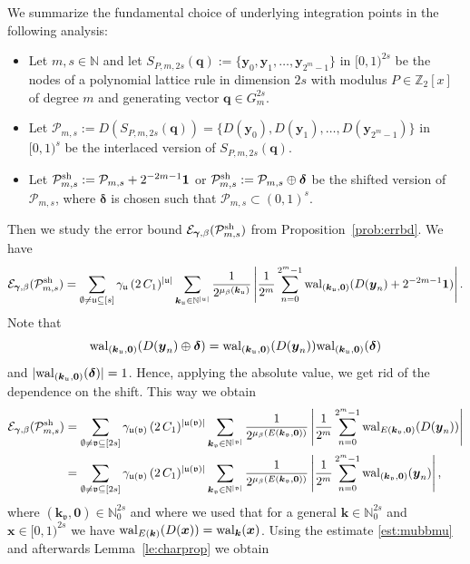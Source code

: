 \documentclass[namedate,webpdf,imanum]{ima-authoring-arxiv}%
\theoremstyle{thmstyletwo}%
\numberwithin{equation}{section}
\newcommand{\wal}{{\rm wal}}
\newcommand{\bsx}{\boldsymbol{x}}
\newcommand{\bsy}{\boldsymbol{y}}
\newcommand{\bsk}{\boldsymbol{k}}
\newcommand{\bsq}{\boldsymbol{q}}
\newcommand{\bsgamma}{\boldsymbol{\gamma}}
\newcommand{\bszero}{\boldsymbol{0}}
\newcommand{\bsdelta}{\boldsymbol{\delta}}
\newcommand{\uu}{\mathfrak{u}}
\newcommand{\vv}{\mathfrak{v}}
\newcommand{\cP}{\mathcal{P}}
\begin{document}
We summarize the fundamental choice of underlying integration points in the following analysis:
\begin{itemize}
\item Let $m,s\in \mathbb{N}$ and let $S_{P, m, 2s}(\bsq) := \{\bsy_0, \bsy_1, \ldots, \bsy_{2^m-1}\}$ in $[0,1)^{2s}$ be the nodes of a polynomial lattice rule in dimension $2 s$ with modulus $P \in \mathbb{Z}_2[x]$ of degree $m$ and generating vector $\bsq \in G_m^{2s}$. 
\item Let $\cP_{m,s} := D(S_{P,m,2s}(\bsq)) = \{D(\bsy_0), D(\bsy_1), \ldots, D(\bsy_{2^m-1})\}$ in $[0,1)^s$ be the interlaced version of $S_{P, m, 2s}(\bsq)$. 
\item Let $\cP_{m,s}^{{\rm sh}}:=\cP_{m,s} + 2^{-2m-1} \boldsymbol{1}$ or $\cP_{m,s}^{{\rm sh}} := \cP_{m,s} \oplus \bsdelta$ be the shifted version of $\cP_{m,s}$, where $\bsdelta$ is chosen such that $ \cP_{m,s} \subset (0,1)^s$.
\end{itemize}
Then we study the error bound $\mathcal{E}_{\bsgamma,\beta}(\cP_{m,s}^{{\rm sh}})$ from Proposition~\ref{prob:errbd}. We have
\begin{align*}
\mathcal{E}_{\bsgamma,\beta}(\cP_{m,s}^{{\rm sh}})=  \sum_{\emptyset \not= \uu \subseteq [s]} \gamma_{\uu} \, (2 \, C_1)^{|\uu|} \sum_{\bsk_\uu \in \mathbb{N}^{|\uu|}} \frac{1}{2^{\mu_{\beta}(\bsk_{\uu})}}  \left|\frac{1}{2^m} \sum_{n=0}^{2^m-1} \wal_{(\bsk_\uu,\bszero)}(D(\bsy_n) +2^{-2m-1} \boldsymbol{1})\right|.
\end{align*}
Note that $$\wal_{(\bsk_\uu,\bszero)}(D(\bsy_n) \oplus \bsdelta)=\wal_{(\bsk_\uu,\bszero)}(D(\bsy_n)) \wal_{(\bsk_\uu,\bszero)}(\bsdelta)$$ and $|\wal_{(\bsk_\uu,\bszero)}(\bsdelta)|=1$. Hence, applying the absolute value, we get rid of the dependence on the shift. This way we obtain 
\begin{align*}
\mathcal{E}_{\bsgamma,\beta}(\cP_{m,s}^{{\rm sh}}) & = \sum_{\emptyset \not= \vv \subseteq [2s]} \gamma_{\uu(\vv)} \, (2 \,C_1)^{|\uu(\vv)|} \sum_{\bsk_\vv \in \mathbb{N}^{|\vv|}} \frac{1}{2^{\mu_{\beta}(E(\bsk_{\vv}, \bszero))}}  \left|\frac{1}{2^m} \sum_{n=0}^{2^m-1} \wal_{E(\bsk_\vv,\bszero)}(D(\bsy_n))\right|\\
& = \sum_{\emptyset \not= \vv \subseteq [2s]} \gamma_{\uu(\vv)} \, (2 \, C_1)^{|\uu(\vv)|} \sum_{\bsk_\vv \in \mathbb{N}^{|\vv|}} \frac{1}{2^{\mu_{\beta}(E(\bsk_{\vv}, \bszero))}}  \left|\frac{1}{2^m} \sum_{n=0}^{2^m-1} \wal_{(\bsk_\vv,\bszero)}(\bsy_n)\right|,
\end{align*}
where $(\bsk_\vv, \bszero) \in \mathbb{N}_0^{2s}$ and where we used that for a general $\bsk \in \mathbb{N}_0^{2s}$ and $\bsx \in [0,1)^{2s}$ we have $\wal_{E(\bsk)}(D(\bsx)) = \wal_{\bsk}(\bsx)$. Using the estimate \eqref{est:mubbmu} and afterwards Lemma~\ref{le:charprop} we obtain
\end{document}
